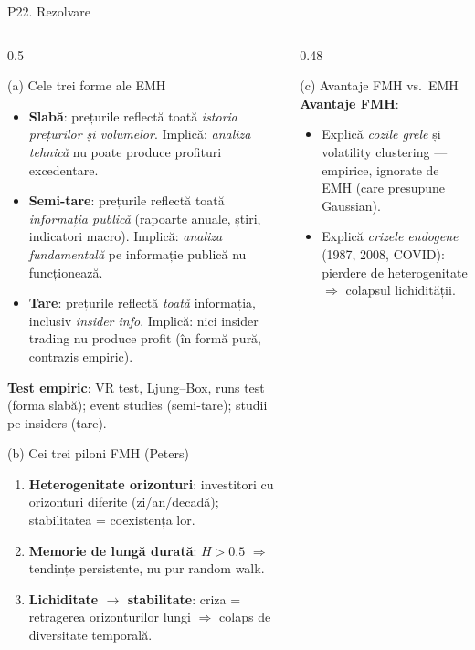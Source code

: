 \documentclass[9pt, aspectratio=169, t]{beamer}
\begin{document}
\begin{frame}[shrink=25]{P22. Rezolvare}
\begin{columns}[T]
\begin{column}{0.5\textwidth}
\begin{block}{(a) Cele trei forme ale EMH}
\begin{itemize}\setlength{\itemsep}{1pt}
    \item \textbf{Slabă}: prețurile reflectă toată \emph{istoria prețurilor și volumelor}. Implică: \emph{analiza tehnică} nu poate produce profituri excedentare.
    \item \textbf{Semi-tare}: prețurile reflectă toată \emph{informația publică} (rapoarte anuale, știri, indicatori macro). Implică: \emph{analiza fundamentală} pe informație publică nu funcționează.
    \item \textbf{Tare}: prețurile reflectă \emph{toată} informația, inclusiv \emph{insider info}. Implică: nici insider trading nu produce profit (în formă pură, contrazis empiric).
\end{itemize}
\textbf{Test empiric}: VR test, Ljung--Box, runs test (forma slabă); event studies (semi-tare); studii pe insiders (tare).
\end{block}
\begin{block}{(b) Cei trei piloni FMH (Peters)}
\begin{enumerate}\setlength{\itemsep}{1pt}
    \item \textbf{Heterogenitate orizonturi}: investitori cu orizonturi diferite (zi/an/decadă); stabilitatea = coexistența lor.
    \item \textbf{Memorie de lungă durată}: $H>0.5$ $\Rightarrow$ tendințe persistente, nu pur random walk.
    \item \textbf{Lichiditate $\to$ stabilitate}: criza = retragerea orizonturilor lungi $\Rightarrow$ colaps de diversitate temporală.
\end{enumerate}
\end{block}
\end{column}
\begin{column}{0.48\textwidth}
\begin{block}{(c) Avantaje FMH vs.\ EMH}
\textbf{Avantaje FMH}:
\begin{itemize}\setlength{\itemsep}{0pt}
    \item Explică \emph{cozile grele} și volatility clustering --- empirice, ignorate de EMH (care presupune Gaussian).
    \item Explică \emph{crizele endogene} (1987, 2008, COVID): pierdere de heterogenitate $\Rightarrow$ colapsul lichidității.

\end{itemize}
\end{block}
\end{column}
\end{columns}
\end{frame}
\end{document}
